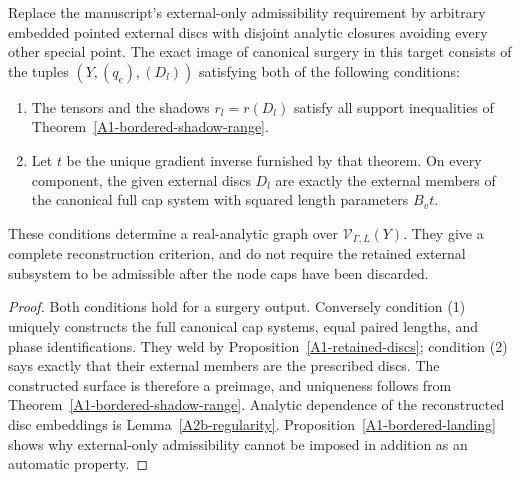 \begin{corollary}
\label{A1-bordered-shape-image}
Replace the manuscript's external-only admissibility requirement
by arbitrary embedded pointed external discs with disjoint
analytic closures avoiding every other special point. The exact
image of canonical surgery in this target consists of the tuples
$(Y,(q_e),(D_l))$ satisfying both of the following conditions:
\begin{enumerate}
\item The tensors and the shadows $r_l=r(D_l)$ satisfy all support
inequalities of Theorem~\ref{A1-bordered-shadow-range}.
\item Let $t$ be the unique gradient inverse furnished by that
theorem. On every component, the given external discs $D_l$ are
exactly the external members of the canonical full cap system
with squared length parameters $B_vt$.
\end{enumerate}
These conditions determine a real-analytic graph over
$\mathcal V_{\Gamma,L}(Y)$. They give a complete reconstruction
criterion, and do not require the retained external subsystem
to be admissible after the node caps have been discarded.
\end{corollary}
\begin{proof}
Both conditions hold for a surgery output. Conversely condition
(1) uniquely constructs the full canonical cap systems, equal
paired lengths, and phase identifications. They weld by
Proposition~\ref{A1-retained-discs}; condition (2) says exactly
that their external members are the prescribed discs. The
constructed surface is therefore a preimage, and uniqueness
follows from Theorem~\ref{A1-bordered-shadow-range}. Analytic
dependence of the reconstructed disc embeddings is
Lemma~\ref{A2b-regularity}. Proposition~\ref{A1-bordered-landing}
shows why external-only admissibility cannot be imposed in
addition as an automatic property.
\end{proof}
